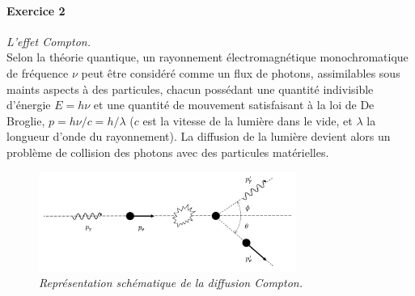 \paragraph{Exercice 2} \textit{L'effet Compton.} \\
Selon la théorie quantique, un rayonnement électromagnétique monochromatique de fréquence $\nu$ peut être considéré comme un flux de photons, assimilables sous maints aspects à des particules, chacun possédant une quantité indivisible d'énergie $E=h\nu$ et une quantité de mouvement satisfaisant à la loi de De Broglie, $p = h\nu/c = h/\lambda$ ($c$ est la vitesse de la lumière dans le vide, et $\lambda$ la longueur d'onde du rayonnement). La diffusion de la lumière devient alors un problème de collision des photons avec des particules matérielles. 

\begin{figure}[h!]
\begin{center}
\includegraphics[width=0.75\textwidth]{Pictures/Compton.PNG}
\end{center}
\caption{\textit{Représentation schématique de la diffusion Compton.}}
\end{figure}

